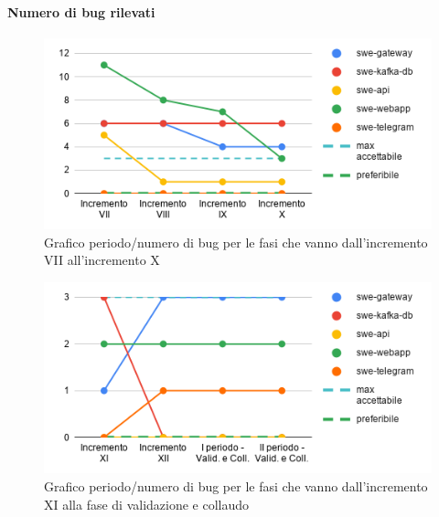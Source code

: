 \paragraph{Numero di bug rilevati}
	\begin{figure}[H]
			\centering
			\includegraphics[width=0.8\linewidth]{./res/images/QM-PROD-6-NBUG.png}
			\caption{Grafico periodo/numero di bug per le fasi che vanno dall'incremento VII all'incremento X}
			\label{fig:Grafico periodo/numero di bug per le fasi che vanno dall'incremento VII all'incremento X}
	\end{figure}
	\begin{figure}[H]
			\centering
			\includegraphics[width=0.8\linewidth]{./res/images/QM-PROD-6-NBUG_1.png}
			\caption{Grafico periodo/numero di bug per le fasi che vanno dall'incremento XI alla fase di validazione e collaudo}
			\label{fig:Grafico periodo/numero di bug per le fasi che vanno dall'incremento XI alla fase di validazione e collaudo}
	\end{figure}

